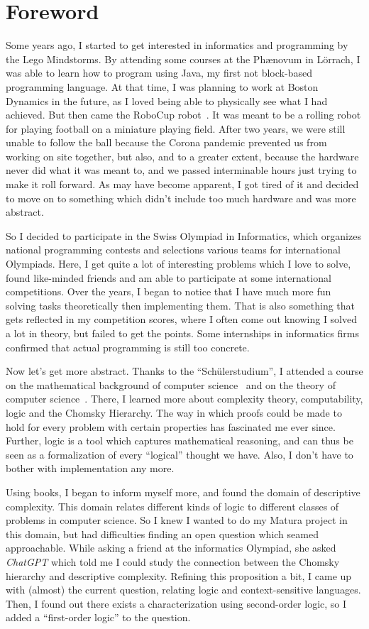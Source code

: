 \chapter*{Foreword}

Some years ago, I started to get interested in informatics and programming by the Lego Mindstorms.
By attending some courses at the Ph\ae novum in Lörrach, I was able to learn how to program using Java, my first not block-based programming language.
At that time, I was planning to work at Boston Dynamics in the future, as I loved being able to physically see what I had achieved.
But then came the RoboCup robot~\cite{roboCup}.
It was meant to be a rolling robot for playing football on a miniature playing field.
After two years, we were still unable to follow the ball because the Corona pandemic prevented us from working on site together, but also, and to a greater extent, because the hardware never did what it was meant to, and we passed interminable hours just trying to make it roll forward.
As may have become apparent, I got tired of it and decided to move on to something which didn't include too much hardware and was more abstract.

So I decided to participate in the Swiss Olympiad in Informatics, which organizes national programming contests and selections various teams for international Olympiads.
Here, I get quite a lot of interesting problems which I love to solve, found like-minded friends and am able to participate at some international competitions.
Over the years, I began to notice that I have much more fun solving tasks theoretically then implementing them.
That is also something that gets reflected in my competition scores, where I often come out knowing I solved a lot in theory, but failed to get the points.
Some internships in informatics firms confirmed that actual programming is still too concrete.

Now let's get more abstract.
Thanks to the ``Schülerstudium'', I attended a course on the mathematical background of computer science~\cite{discrete-maths} and on the theory of computer science~\cite{theory-cs}.
There, I learned more about complexity theory, computability, logic and the Chomsky Hierarchy.
The way in which proofs could be made to hold for every problem with certain properties has fascinated me ever since.
Further, logic is a tool which captures mathematical reasoning, and can thus be seen as a formalization of every ``logical'' thought we have.
Also, I don't have to bother with implementation any more.

Using books, I began to inform myself more, and found the domain of descriptive complexity.
This domain relates different kinds of logic to different classes of problems in computer science.
So I knew I wanted to do my Matura project in this domain, but had difficulties finding an open question which seamed approachable.
While asking a friend at the informatics Olympiad, she asked \emph{ChatGPT} which told me I could study the connection between the Chomsky hierarchy and descriptive complexity.
Refining this proposition a bit, I came up with (almost) the current question, relating logic and context-sensitive languages.
Then, I found out there exists a characterization using second-order logic, so I added a ``first-order logic'' to the question.
